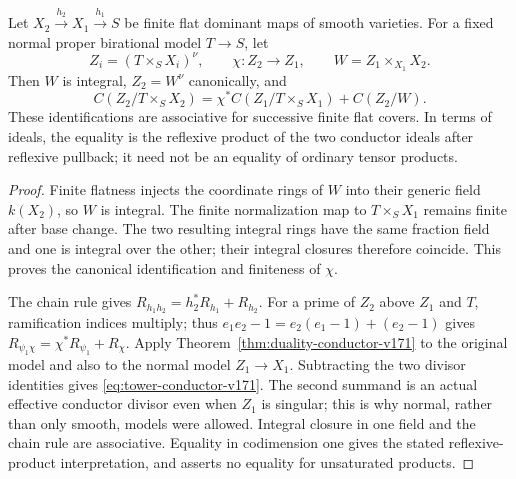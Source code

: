 \begin{theorem}
\label{thm:conductor-tower-v171}
Let $X_2\xrightarrow{h_2}X_1\xrightarrow{h_1}S$ be finite flat
dominant maps of smooth varieties. For a fixed normal proper
birational model $T\to S$, let
\[
 Z_i=(T\times_S X_i)^\nu,\qquad
 \chi:Z_2\longrightarrow Z_1,
 \qquad W=Z_1\times_{X_1}X_2.
\]
Then $W$ is integral, $Z_2=W^\nu$ canonically, and
\begin{equation}\label{eq:tower-conductor-v171}
 C(Z_2/T\times_S X_2)
 =\chi^*C(Z_1/T\times_S X_1)+C(Z_2/W).
\end{equation}
These identifications are associative for successive finite flat
covers. In terms of ideals, the equality is the reflexive product
of the two conductor ideals after reflexive pullback; it need not
be an equality of ordinary tensor products.
\end{theorem}
\begin{proof}
Finite flatness injects the coordinate rings of $W$ into their generic
field $k(X_2)$, so $W$ is integral. The finite normalization map to
$T\times_S X_1$ remains finite after base change. The two resulting
integral rings have the same fraction field and one is integral over
the other; their integral closures therefore coincide. This proves the
canonical identification and finiteness of $\chi$.

The chain rule gives
$R_{h_1h_2}=h_2^*R_{h_1}+R_{h_2}$.
For a prime of $Z_2$ above $Z_1$ and $T$, ramification indices multiply;
thus $e_1e_2-1=e_2(e_1-1)+(e_2-1)$ gives
$R_{\psi_1\chi}=\chi^*R_{\psi_1}+R_\chi$.
Apply Theorem~\ref{thm:duality-conductor-v171} to the original model
and also to the normal model $Z_1\to X_1$. Subtracting the two divisor
identities gives \eqref{eq:tower-conductor-v171}. The second summand
is an actual effective conductor divisor even when $Z_1$ is singular;
this is why normal, rather than only smooth, models were allowed.
Integral closure in one field and the chain rule are associative.
Equality in codimension one gives the stated reflexive-product
interpretation, and asserts no equality for unsaturated products.
\end{proof}

